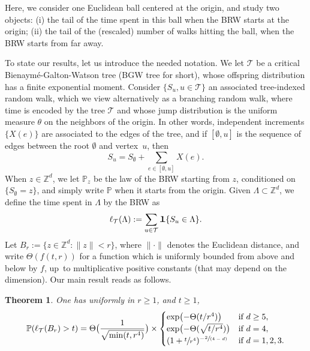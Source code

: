 \documentclass[JEP,XML,SOM,Unicode,NoFloatCountersInSection,published]{cedram}
\newcommand{\spfrac}[2]{\sfrac{#1}{(#2)}}
\theoremstyle{plain}
\newtheorem{theorem}{Theorem}[section]
\theoremstyle{definition}
\newcommand\Z{\mathbb{Z}}
\newcommand\T{\mathcal{T}}
\newcommand{\1}{{\text{\Large $\mathfrak 1$}}}
\begin{document}
Here, we consider one Euclidean ball centered at the origin, and study
two objects:
(i) the tail of the time spent in this ball when the
BRW starts at the origin;
(ii) the tail of the (rescaled) number of walks hitting the ball,
when the BRW starts from far away.

To state our results, let us introduce the needed notation. We let $\mathbf {\mathcal T}$ be a critical
Bienaymé-Galton-Watson tree (BGW tree for short),
whose offspring distribution has a finite exponential moment.
Consider $\{S_u, u\in \mathbf {\mathcal T}\}$
an associated tree-indexed random walk,
which we view alternatively as a branching random walk, where
time is encoded by the tree $\mathcal T$ and
whose jump distribution is the uniform measure $\theta$ on the neighbors of the origin.
In other words, independent
increments $\{X(e)\}$ are associated to the edges of the tree, and if
$[\emptyset,u]$ is the sequence of edges between the root $\emptyset$ and
vertex~$u$, then
\[
S_u=S_\emptyset+\sum_{e\in [\emptyset,u]}X(e).
\]
When $z\in \Z^d$, we let $\mathbb P_z$ be the law of the BRW
starting from $z$, \ie conditioned on $\{S_\emptyset=z\}$, and simply write $\mathbb P$ when it starts from the origin.
Given $\Lambda\subset \Z^d$, we define the time spent in $\Lambda$ by the BRW as
\begin{equation*}%
\ell_{\T}(\Lambda) := \sum_{u\in \mathcal T}
\1\{S_u \in \Lambda\}.
\end{equation*}
Let $B_r:=\{z\in \Z^d : \|z\|< r\}$, where $\|{\cdot}\|$
denotes the Euclidean distance, and
write $\Theta(f(t,r))$ for a function which is uniformly
bounded from above and below by $f$, up~to
multiplicative positive constants (that may depend on the dimension). Our main result reads as follows.

\begin{theorem} \label{theo.main}
One has uniformly in $r\ge 1$, and $t\ge 1$,
\begin{equation*}%
\mathbb P(\ell_{\T}(B_r) > t) =
\Theta\bigl(\frac{1}{\sqrt{\min(t,r^4)}}\bigr) \times
\begin{cases}
\exp \bigl(-\Theta(t/r^4)\bigr) & \text{if }d\ge 5, \\
\exp\bigl(- \Theta(\sqrt{ t/r^4})\bigr) & \text{if }d=4,\\
(1+\sfrac t{r^4})^{-\spfrac{2}{4-d}} & \text{if }d=1,2,3.
\end{cases}
\end{equation*}
\end{theorem}
\end{document}
